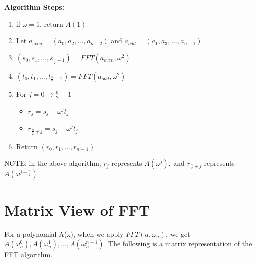 \documentclass[11pt]{article}
\begin{document}
\noindent
\textbf{Algorithm Steps:}
\begin{enumerate}
    \item if $\omega=1$, return $A(1)$
    \item Let $a_{even}=(a_0,a_2,...,a_{n-2})$ and $a_{odd}=(a_1,a_3,...,a_{n-1})$
    \item $(s_0,s_1,...,s_{\frac{n}{2}-1})=FFT(a_{even},\omega^2)$
    \item $(t_0,t_1,...,t_{\frac{n}{2}-1})=FFT(a_{odd},\omega^2)$
    \item For $j = 0 \xrightarrow{} \frac{n}{2} - 1$
    \begin{itemize}
        \item $r_j=s_j+\omega^jt_j$
        \item $r_{\frac{n}{2}+j}=s_j-\omega^jt_j$
    \end{itemize}
    \item Return $(r_0,r_1,...,r_{n-1})$
\end{enumerate}
\textsf{NOTE: in the above algorithm, $r_j$ represents $A(\omega^j)$, and $r_{\frac{n}{2}+j}$ represents $A(\omega^{j+\frac{n}{2}})$}

\section{Matrix View of FFT}
\textsf{For a polynomial A(x), when we apply $FFT(a,\omega_n)$, we get $A(\omega_n^0),A(\omega_n^1),...,A(\omega_n^{n-1})$. The following is a matrix representation of the FFT algorithm.}
\end{document}

